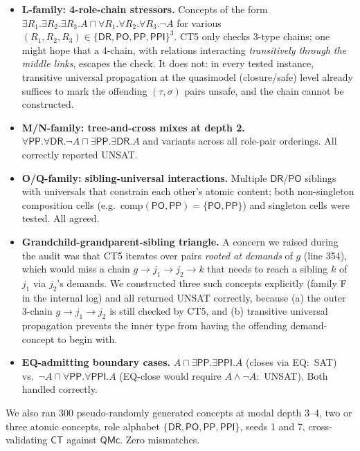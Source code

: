 \documentclass[]{ceurart}
\newcommand{\DR}{\mathsf{DR}}
\newcommand{\PO}{\mathsf{PO}}
\newcommand{\PP}{\mathsf{PP}}
\newcommand{\PPI}{\mathsf{PPI}}
\theoremstyle{definition}
\theoremstyle{remark}
\begin{document}
\begin{itemize}
  \item \textbf{L-family: 4-role-chain stressors.} Concepts of the
    form $\exists R_1 . \exists R_2 . \exists R_3 . A
    \sqcap \forall R_1 . \forall R_2 . \forall R_3 . \neg A$ for
    various $(R_1, R_2, R_3) \in \{\DR,\PO,\PP,\PPI\}^3$. CT5 only
    checks 3-type chains; one might hope that a 4-chain, with
    relations interacting \emph{transitively through the middle
      links}, escapes the check. It does not: in every tested
    instance, transitive universal propagation at the quasimodel
    (closure/safe) level already suffices to mark the offending
    $(\tau,\sigma)$ pairs unsafe, and the chain cannot be constructed.
  \item \textbf{M/N-family: tree-and-cross mixes at depth 2.}
    $\forall \PP . \forall \DR . \neg A \sqcap \exists \PP . \exists
    \DR . A$ and variants across all role-pair orderings. All
    correctly reported UNSAT.
  \item \textbf{O/Q-family: sibling-universal interactions.} Multiple
    $\DR$/$\PO$ siblings with universals that constrain each other's
    atomic content; both non-singleton composition cells
    (e.g.\ $\mathrm{comp}(\PO, \PP) = \{\PO, \PP\}$) and singleton
    cells were tested. All agreed.
  \item \textbf{Grandchild-grandparent-sibling triangle.} A concern
    we raised during the audit was that CT5 iterates over pairs
    \emph{rooted at demands} of $g$ (line 354), which would miss a
    chain $g \to j_1 \to j_2 \to k$ that needs to reach a sibling
    $k$ of $j_1$ via $j_2$'s demands. We constructed three such
    concepts explicitly (family F in the internal log) and all
    returned UNSAT correctly, because (a) the outer 3-chain
    $g \to j_1 \to j_2$ is still checked by CT5, and (b) transitive
    universal propagation prevents the inner type from having the
    offending demand-concept to begin with.
  \item \textbf{EQ-admitting boundary cases.}
    $A \sqcap \exists \PP . \exists \PPI . A$ (closes via EQ:\ SAT)
    vs.\ $\neg A \sqcap \forall \PP . \forall \PPI . A$ (EQ-close
    would require $A \land \neg A$:\ UNSAT). Both handled correctly.
\end{itemize}

We also ran 300 pseudo-randomly generated concepts at modal depth
3--4, two or three atomic concepts, role alphabet $\{\DR,\PO,\PP,
\PPI\}$, seeds 1 and 7, cross-validating $\mathsf{CT}$ against
$\mathsf{QMc}$. Zero mismatches.
\end{document}
